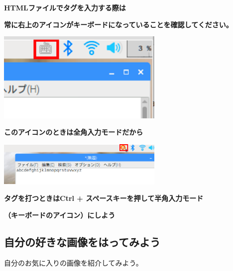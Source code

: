 \documentclass[a4paper,12pt]{jarticle}
\begin{document}
{\centering\bfseries
  HTMLファイルでタグを入力する際は
  \par}

{\centering\bfseries
  常に右上のアイコンがキーボードになっていることを確認してください。
  \par}

\centering
\includegraphics[width=0.6\textwidth]{textbook-img159.png}





\bigskip

\bigskip

\bigskip

\bigskip


{\centering\bfseries
  このアイコンのときは全角入力モードだから
  \par}

\centering
\includegraphics[width=0.6\textwidth]{textbook-img160.png}


\bigskip


\bigskip

{\centering\bfseries
  タグを打つときはCtrl +
  スペースキーを押して半角入力モード
  \par}

{\centering\bfseries
  （キーボードのアイコン）にしよう
  \par}

\clearpage
\flushleft
{}
\subsection{\theExercise 自分の好きな画像をはってみよう}
\addtocounter{Exercise}{-1}\label{E:embImginHTML}
自分のお気に入りの画像を紹介してみよう。
\end{document}
